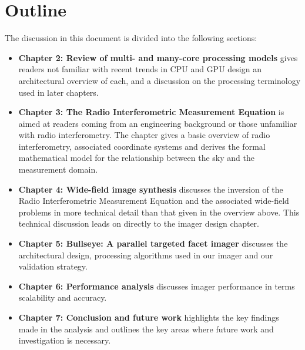 \section{Outline}
The discussion in this document is divided into the following sections:
\begin{itemize}
 \item \textbf{Chapter 2: Review of multi- and many-core processing models} gives readers not familiar with recent trends in CPU and GPU design an architectural overview of each, and a discussion
 on the processing terminology used in later chapters. 
 \item \textbf{Chapter 3: The Radio Interferometric Measurement Equation} is aimed at readers coming from an engineering background or those unfamiliar with radio interferometry. The chapter 
 gives a basic overview of radio interferometry, associated coordinate systems and derives the formal mathematical model for the relationship between the sky and the measurement domain.
 \item \textbf{Chapter 4: Wide-field image synthesis} discusses the inversion of the Radio Interferometric Measurement Equation and the associated wide-field problems 
 in more technical detail than that given in the overview above. This technical discussion leads on directly to the imager design chapter.
 \item \textbf{Chapter 5: Bullseye: A parallel targeted facet imager} discusses the architectural design, processing algorithms used in our imager and our validation strategy.
 \item \textbf{Chapter 6: Performance analysis} discusses imager performance in terms scalability and accuracy.
 \item \textbf{Chapter 7: Conclusion and future work} highlights the key findings made in the analysis and outlines the key areas where future work and investigation is necessary.
\end{itemize}
